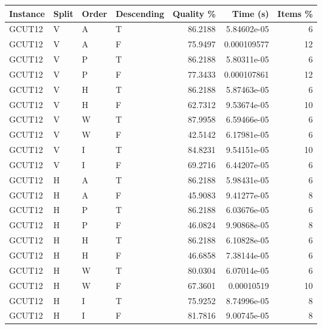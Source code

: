 \begin{tabular}{llllrrr}
    \hline
    Instance & Split & Order & Descending & Quality \% & Time (s)    & Items \% \\
    \hline
    GCUT12   & V     & A     & T          & 86.2188    & 5.84602e-05 & 6        \\
    GCUT12   & V     & A     & F          & 75.9497    & 0.000109577 & 12       \\
    GCUT12   & V     & P     & T          & 86.2188    & 5.80311e-05 & 6        \\
    GCUT12   & V     & P     & F          & 77.3433    & 0.000107861 & 12       \\
    GCUT12   & V     & H     & T          & 86.2188    & 5.87463e-05 & 6        \\
    GCUT12   & V     & H     & F          & 62.7312    & 9.53674e-05 & 10       \\
    GCUT12   & V     & W     & T          & 87.9958    & 6.59466e-05 & 6        \\
    GCUT12   & V     & W     & F          & 42.5142    & 6.17981e-05 & 6        \\
    GCUT12   & V     & I     & T          & 84.8231    & 9.54151e-05 & 10       \\
    GCUT12   & V     & I     & F          & 69.2716    & 6.44207e-05 & 6        \\
    GCUT12   & H     & A     & T          & 86.2188    & 5.98431e-05 & 6        \\
    GCUT12   & H     & A     & F          & 45.9083    & 9.41277e-05 & 8        \\
    GCUT12   & H     & P     & T          & 86.2188    & 6.03676e-05 & 6        \\
    GCUT12   & H     & P     & F          & 46.0824    & 9.90868e-05 & 8        \\
    GCUT12   & H     & H     & T          & 86.2188    & 6.10828e-05 & 6        \\
    GCUT12   & H     & H     & F          & 46.6858    & 7.38144e-05 & 6        \\
    GCUT12   & H     & W     & T          & 80.0304    & 6.07014e-05 & 6        \\
    GCUT12   & H     & W     & F          & 67.3601    & 0.00010519  & 10       \\
    GCUT12   & H     & I     & T          & 75.9252    & 8.74996e-05 & 8        \\
    GCUT12   & H     & I     & F          & 81.7816    & 9.00745e-05 & 8        \\

\end{tabular}
